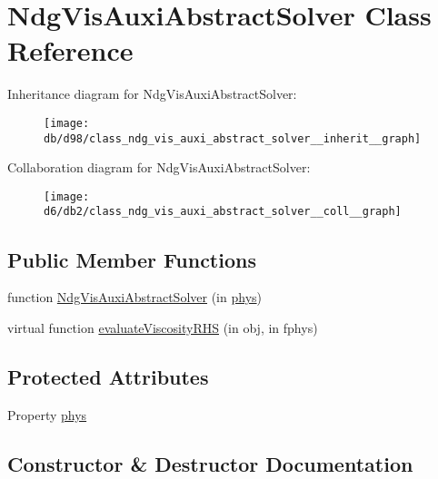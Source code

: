 \hypertarget{class_ndg_vis_auxi_abstract_solver}{}\section{Ndg\+Vis\+Auxi\+Abstract\+Solver Class Reference}
\label{class_ndg_vis_auxi_abstract_solver}


Inheritance diagram for Ndg\+Vis\+Auxi\+Abstract\+Solver\+:
\nopagebreak
\begin{figure}[H]
\begin{center}
\leavevmode
\texttt{[image: db/d98/class\_ndg\_vis\_auxi\_abstract\_solver\_\_inherit\_\_graph]}
\end{center}
\end{figure}


Collaboration diagram for Ndg\+Vis\+Auxi\+Abstract\+Solver\+:
\nopagebreak
\begin{figure}[H]
\begin{center}
\leavevmode
\texttt{[image: d6/db2/class\_ndg\_vis\_auxi\_abstract\_solver\_\_coll\_\_graph]}
\end{center}
\end{figure}
\subsection*{Public Member Functions}
\begin{DoxyCompactItemize}
\item 
function \hyperlink{class_ndg_vis_auxi_abstract_solver_a81a44da1ccfec964108deee13e6f4480}{Ndg\+Vis\+Auxi\+Abstract\+Solver} (in \hyperlink{class_ndg_vis_auxi_abstract_solver_a82d0de9b132a7d5fc9d521912cb72840}{phys})
\item 
virtual function \hyperlink{class_ndg_vis_auxi_abstract_solver_a019312ae8879a9f5071acac6a8285ccb}{evaluate\+Viscosity\+R\+HS} (in obj, in fphys)
\end{DoxyCompactItemize}
\subsection*{Protected Attributes}
\begin{DoxyCompactItemize}
\item 
Property \hyperlink{class_ndg_vis_auxi_abstract_solver_a82d0de9b132a7d5fc9d521912cb72840}{phys}
\end{DoxyCompactItemize}


\subsection{Constructor \& Destructor Documentation}
\mbox{\label{class_ndg_vis_auxi_abstract_solver_a81a44da1ccfec964108deee13e6f4480}} 
